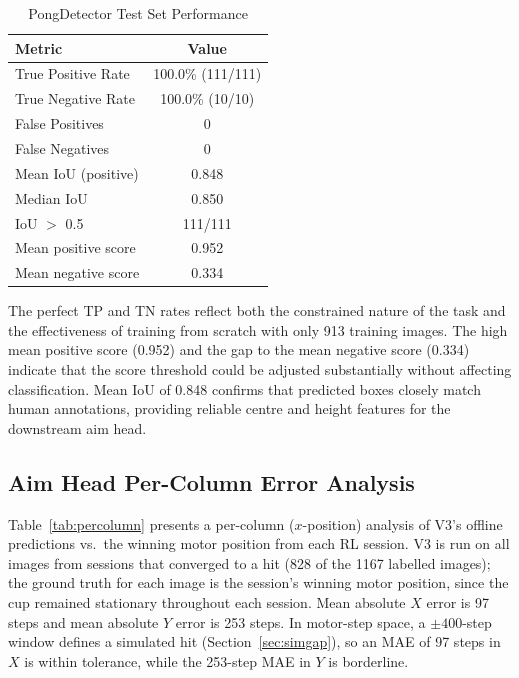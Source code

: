 \documentclass[conference]{IEEEtran}
\begin{document}
\begin{table}[ht]
\centering
\caption{PongDetector Test Set Performance}
\label{tab:detector}
\begin{tabular}{lc}
\toprule
Metric & Value \\
\midrule
True Positive Rate  & 100.0\% (111/111) \\
True Negative Rate  & 100.0\% (10/10)   \\
False Positives     & 0                 \\
False Negatives     & 0                 \\
Mean IoU (positive) & 0.848             \\
Median IoU          & 0.850             \\
IoU $>$ 0.5         & 111/111           \\
Mean positive score & 0.952             \\
Mean negative score & 0.334             \\
\bottomrule
\end{tabular}
\end{table}

The perfect TP and TN rates reflect both the constrained nature of the task and
the effectiveness of training from scratch with only 913 training images.  The
high mean positive score (0.952) and the gap to the mean negative score (0.334)
indicate that the score threshold could be adjusted substantially without
affecting classification.  Mean IoU of 0.848 confirms that predicted boxes
closely match human annotations, providing reliable centre and height features
for the downstream aim head.

\subsection{Aim Head Per-Column Error Analysis}

Table~\ref{tab:percolumn} presents a per-column ($x$-position) analysis of V3's
offline predictions vs.\ the winning motor position from each RL session. V3 is
run on all images from sessions that converged to a hit (828 of the 1167
labelled images); the ground truth for each image is the session's winning
motor position, since the cup remained stationary throughout each session. Mean
absolute $X$ error is 97 steps and mean absolute $Y$ error is 253 steps.  In
motor-step space, a $\pm400$-step window defines a simulated hit
(Section~\ref{sec:simgap}), so an MAE of 97 steps in $X$ is within tolerance,
while the 253-step MAE in $Y$ is borderline.
\end{document}
